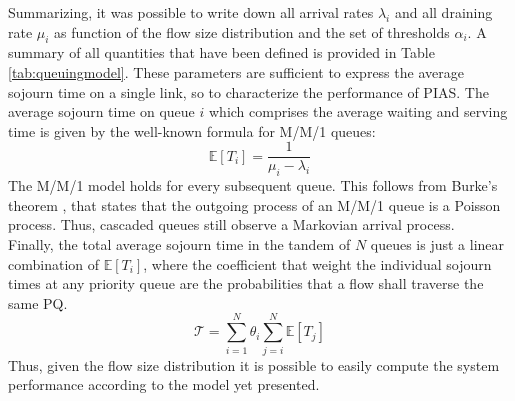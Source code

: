 \begin{table}%
	\label{tab:queuingmodel}
	\footnotesize 
	\centering
	\caption{Variables of the model.}
\end{table}

Summarizing, it was possible to write down all arrival rates $\lambda_{i}$ and all draining rate $\mu_i$ as function of the flow size distribution and the set of thresholds $\alpha_i$. A summary of all quantities that have been defined is provided in Table \ref{tab:queuingmodel}.
These parameters are sufficient to express the average sojourn time on a single link, so to characterize the performance of PIAS. The average sojourn time on queue $i$ which comprises the average waiting and serving time is given by the well-known formula for M/M/1 queues:
\begin{equation}
\label{mm1}
\mathbb{E}[T_i] = \dfrac{1}{\mu_i-\lambda_i}
\end{equation}
The M/M/1 model holds for every subsequent queue. This follows from Burke's theorem \cite{burke}, that states that the outgoing process of an M/M/1 queue is a Poisson process. Thus, cascaded queues still observe a Markovian arrival process. \\
Finally, the total average sojourn time in the tandem of $N$ queues is just a linear combination of $\mathbb{E}[T_i]$, where the coefficient that weight the individual sojourn times at any priority queue are the probabilities that a flow shall traverse the same PQ.
\begin{equation}
\mathcal{T} = 
\sum_{i=1}^{N} \theta_i \sum_{j=i}^{N}\mathbb{E}[T_j]
\end{equation}
Thus, given the flow size distribution it is possible to easily compute the system performance according to the model yet presented. 

